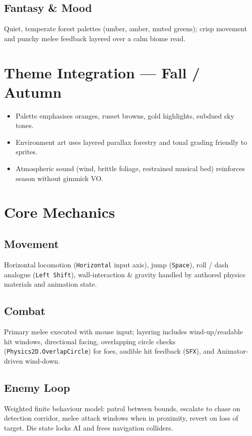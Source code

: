 \documentclass[11pt,a4paper]{article}
\begin{document}
\subsection{Fantasy \& Mood}
Quiet, temperate forest palettes (umber, amber, muted greens); crisp movement and punchy melee feedback layered over a calm biome read.

\section{Theme Integration --- Fall / Autumn}

\begin{itemize}[leftmargin=*]
    \item Palette emphasises oranges, russet browns, gold highlights, subdued sky tones.
    \item Environment art uses layered parallax forestry and tonal grading friendly to sprites.
    \item Atmospheric sound (wind, brittle foliage, restrained musical bed) reinforces season without gimmick VO.
\end{itemize}

\section{Core Mechanics}

\subsection{Movement}
Horizontal locomotion (\texttt{Horizontal} input axis), jump (\texttt{Space}), roll / dash analogue (\texttt{Left Shift}), wall-interaction \& gravity handled by authored physics materials and animation state.

\subsection{Combat}
Primary melee executed with mouse input; layering includes wind-up/readable hit windows, directional facing, overlapping circle checks (\texttt{Physics2D.OverlapCircle}) for foes, audible hit feedback (\texttt{SFX}), and Animator-driven wind-down.

\subsection{Enemy Loop}
Weighted finite behaviour model: patrol between bounds, escalate to chase on detection corridor, melee attack windows when in proximity, revert on loss of target. Die state locks AI and frees navigation colliders.
\end{document}
